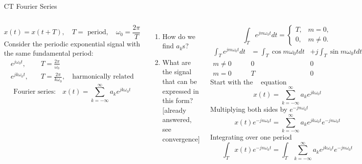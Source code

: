 \begin{frame}{CT Fourier Series}
    \begin{columns}
            \begin{equation*}
                x(t) = x(t+T), \quad T = \text{ period},  \quad\omega_0 = \frac{2\pi}{T}
            \end{equation*}
            Consider the periodic exponential signal with the same fundamental period:
            \begin{align*}
                e^{j\omega_0 t},  & \quad T = \frac{2\pi}{\omega_0}\\
                e^{jk\omega_0 t},  &\quad  T = \frac{2\pi}{k\omega_0},  \quad \text{harmonically related}
            \end{align*}
            \begin{equation*}
                \text{Fourier series:}\quad  x(t) = \sum_{k=-\infty}^{\infty}a_k e^{jk\omega_0 t}
            \end{equation*}
            \pause
            \begin{enumerate}
              \item How do we find $a_k$s?
              \item What are the signal that can be expressed in this form? [already answered, see convergence]
            \end{enumerate}
            {
            \begin{equation*}
                \int_{T}e^{jm\omega_0t}dt = \begin{cases}T, & m=0,\\0, &m\neq 0.\end{cases}
            \end{equation*}
            \pause
            \begin{equation*}
                \begin{array}{ccc}
                    \int_{T}e^{jm\omega_0t}dt &= \int_{T}\cos m\omega_0 t dt &+  j\int_{T}\sin m\omega_0 t dt\\
                    m\neq 0 & 0 & 0\\
                    m = 0 & T & 0
                \end{array}
            \end{equation*}
            \pause
            Start with the \fs~ equation
            \begin{equation*}
                x(t) = \sum_{k=-\infty}^{\infty}a_k e^{jk\omega_0 t}
            \end{equation*}
            Multiplying both sides by $e^{-jn\omega_0t}$
            \begin{equation*}
                x(t)e^{-jn\omega_0t} = \sum_{k=-\infty}^{\infty}a_k e^{jk\omega_0 t}e^{-jn\omega_0t}
            \end{equation*}
            Integrating over one period
            \begin{equation*}
                \int_{T}x(t)e^{-jn\omega_0t} = \int_{T}\sum_{k=-\infty}^{\infty}a_k e^{jk\omega_0 t}e^{-jn\omega_0t}
            \end{equation*}

}
\end{columns}
\end{frame}
